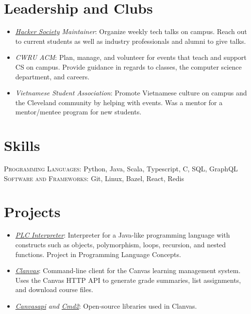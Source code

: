 \documentclass[a4paper,11pt]{article}
\begin{document}
\section{Leadership and Clubs}
\begin{itemize}[noitemsep]
	\item \emph{\href{http://hacsoc.org}{Hacker Society} Maintainer}: Organize weekly tech talks on campus. Reach out to current students as well as industry professionals and alumni to give talks.
	\item \emph{CWRU ACM}: Plan, manage, and volunteer for events that teach and support CS on campus. Provide guidance in regards to classes, the computer science department, and careers.
	\item \emph{Vietnamese Student Association}: Promote Vietnamese culture on campus and the Cleveland community by helping with events. Was a mentor for a mentor/mentee program for new students.
\end{itemize}
\section{Skills}
\textsc{Programming Languages}: Python, Java, Scala, Typescript, C, SQL, GraphQL \\
\textsc{Software and Frameworks}: Git, Linux, Bazel, React, Redis
\section{Projects}
\begin{itemize}
    \item \emph{\href{https://github.com/marklalor/PLCInterpreter}{PLC Interpreter}}: Interpreter for a Java-like programming language with constructs such as objects, polymorphism, loops, recursion, and nested functions. Project in Programming Language Concepts.
    \item \emph{\href{https://github.com/marklalor/clanvas}{Clanvas}}: Command-line client for the Canvas learning management system. Uses the Canvas HTTP API to generate grade summaries, list assignments, and download course files.
    \item \emph{\href{https://github.com/ucfopen/canvasapi}{Canvasapi} and \href{https://github.com/python-cmd2/cmd2}{Cmd2}}: Open-source libraries used in Clanvas.
\end{itemize}
\end{document}
